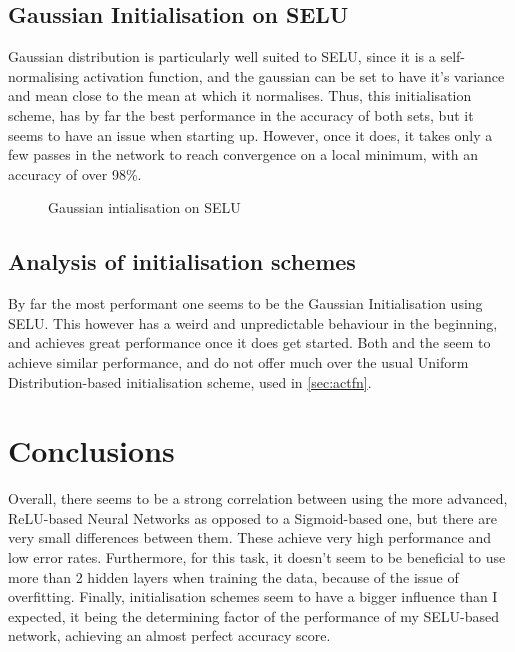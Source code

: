 \documentclass{article}
\begin{document}
\subsection{Gaussian Initialisation on SELU}
Gaussian distribution is particularly well suited to SELU, since it is a self-normalising activation function, and the gaussian can be set to have it's variance and mean close to the mean at which it normalises. Thus, this initialisation scheme, has by far the best performance in the accuracy of both sets, but it seems to have an issue when starting up. However, once it does, it takes only a few passes in the network to reach convergence on a local minimum, with an accuracy of over 98\%.
\begin{figure}[H]
    \centering
    \begin{subfigure}{}
      
    \end{subfigure}
    \begin{subfigure}{}
      
    \end{subfigure}
    \caption{Gaussian intialisation on SELU}
\end{figure}

\subsection{Analysis of initialisation schemes}
By far the most performant one seems to be the Gaussian Initialisation using SELU. This however has a weird and unpredictable behaviour in the beginning, and achieves great performance once it does get started. Both  and the  seem to achieve similar performance, and do not offer much over the usual Uniform Distribution-based initialisation scheme, used in \ref{sec:actfn}.

\section{Conclusions}\label{sec:concl}

Overall, there seems to be a strong correlation between using the more advanced, ReLU-based Neural Networks as opposed to a Sigmoid-based one, but there are very small differences between them. These achieve very high performance and low error rates. Furthermore, for this task, it doesn't seem to be beneficial to use more than 2 hidden layers when training the data, because of the issue of overfitting. Finally, initialisation schemes seem to have a bigger influence than I expected, it being the determining factor of the performance of my SELU-based network, achieving an almost perfect accuracy score.
\end{document}

